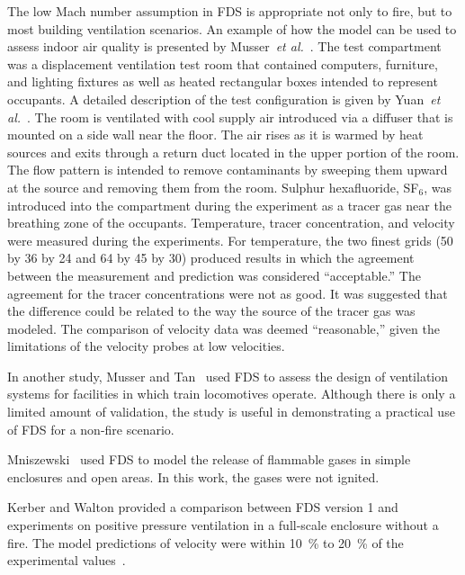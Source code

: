 The low Mach number assumption in FDS is appropriate not only to fire, but to  most building  ventilation scenarios.  An  example of  how the model
can  be used  to  assess indoor  air  quality  is presented  by Musser~{\em  et  al.}~\cite{Musser:1}.   The  test compartment  was  a displacement
ventilation  test   room   that  contained   computers, furniture, and  lighting fixtures as well as  heated rectangular boxes intended to  represent
occupants.  A detailed description  of the test configuration is  given by Yuan~{\em et  al.}~\cite{Yuan:1}.  The room is ventilated with  cool
supply air introduced via  a diffuser that is mounted on a side  wall near the floor. The air rises  as it is warmed by heat sources  and exits
through a return duct  located in the upper portion  of  the  room.  The   flow  pattern  is  intended  to  remove contaminants by sweeping  them
upward at the source  and removing them from the room.  Sulphur  hexafluoride, SF$_6$, was introduced into the compartment during the  experiment as
a tracer gas  near the breathing zone  of  the   occupants.   Temperature,  tracer  concentration,  and velocity were  measured during the
experiments.   For temperature, the two finest grids (50 by 36 by  24 and 64 by 45 by 30) produced results in  which the  agreement between  the
measurement  and  prediction was considered  ``acceptable.''  The agreement  for the  tracer concentrations were  not as  good.  It  was suggested  that
the  difference  could be related to  the way  the source  of the tracer  gas was  modeled.  The comparison  of   velocity  data  was  deemed
``reasonable,''  given  the limitations of the velocity probes at low velocities.

In another  study, Musser and  Tan~\cite{Musser:2} used FDS  to assess the  design  of ventilation  systems  for  facilities  in which  train
locomotives  operate.  Although there  is  only  a  limited amount  of validation, the  study is useful  in demonstrating a practical  use of FDS for
a non-fire scenario.

Mniszewski~\cite{Mniszewski:1}  used  FDS  to  model  the  release  of flammable gases in simple enclosures and open areas. In this work, the gases
were not ignited.

Kerber  and Walton  provided a  comparison between  FDS version  1 and experiments on positive pressure ventilation in a full-scale enclosure without
a fire.   The model predictions of velocity  were within 10~\% to 20~\% of the experimental values~\cite{Kerber:1}.


